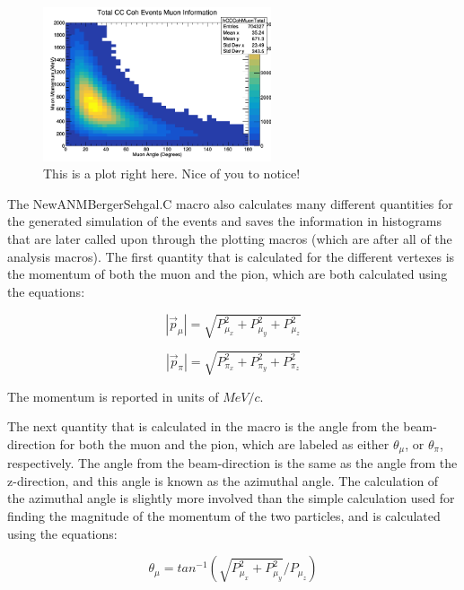 \documentclass[11pt]{article}
\begin{document}
\begin{figure}[H]
\centering
\includegraphics[width=0.6\textwidth]{NewANMBergerSehgalImages/9-TotalCCCohMuonInfoANMBS.png}
\caption{This is a plot right here. Nice of you to notice!}
\end{figure}

The NewANMBergerSehgal.C macro also calculates many different quantities for the generated simulation of the events and saves the information in histograms that are later called upon through the plotting macros (which are after all of the analysis macros). The first quantity that is calculated for the different vertexes is the momentum of both the muon and the pion, which are both calculated using the equations:

\begin{equation}
|\vec{p}_\mu| = \sqrt{P_{\mu_x}^2 + P_{\mu_y}^2 + P_{\mu_z}^2}
\end{equation}

\begin{equation}
|\vec{p}_\pi| = \sqrt{P_{\pi_x}^2 + P_{\pi_y}^2 + P_{\pi_z}^2}
\end{equation}

\noindent
The momentum is reported in units of $MeV/c$.

The next quantity that is calculated in the macro is the angle from the beam-direction for both the muon and the pion, which are labeled as either $\theta_\mu$, or $\theta_\pi$, respectively. The angle from the beam-direction is the same as the angle from the z-direction, and this angle is known as the azimuthal angle. The calculation of the azimuthal angle is slightly more involved than the simple calculation used for finding the magnitude of the momentum of the two particles, and is calculated using the equations:

\begin{equation}
\theta_\mu = tan^{-1}(\sqrt{P_{\mu_x}^2 + P_{\mu_y}^2}/{P_{\mu_z}})
\end{equation}
\end{document}
